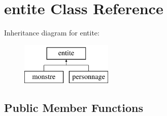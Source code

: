 \hypertarget{classentite}{}\section{entite Class Reference}
\label{classentite}
Inheritance diagram for entite\+:\begin{figure}[H]
\begin{center}
\leavevmode
\includegraphics[height=2.000000cm]{classentite}
\end{center}
\end{figure}
\subsection*{Public Member Functions}
